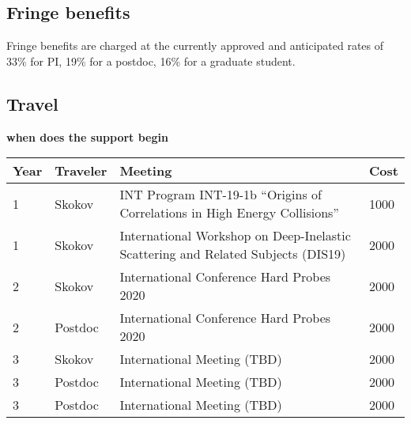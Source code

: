 \documentclass{DOEproposal}
\newcommand{\TODO}{\color{red} \bf}
\begin{document}
		\subsection*{Fringe benefits} 
		\vspace{0.5em}			
	
		\noindent 	
		Fringe benefits are charged at the currently approved and anticipated rates of 33\%
		for PI, 19\% for a postdoc, 
		16\% for a graduate student.%
		\vspace{1.2em}			

		\subsection*{Travel} 

		\vspace{0.5em}			
		
		{\TODO {when does the support begin} } \\ 
		\begin{center}
{%
\begin{tabular}{|l|l|p{90mm}|l| }
\hline
Year &  Traveler \hspace{0.5cm}  &  Meeting  & Cost   \\
\hline
1 &  Skokov  &  INT Program INT-19-1b
``Origins of Correlations in High Energy Collisions'' & 1000   \\
\hline
1  & Skokov  & International Workshop on Deep-Inelastic Scattering and Related Subjects (DIS19)   & 2000   \\ \hline
2  & Skokov  & International Conference Hard Probes 2020  &  2000   \\ \hline
2  & Postdoc  & 
 International Conference Hard Probes 2020 
 &  2000  \\ \hline
3  & Skokov  & International Meeting (TBD) &  2000  \\ \hline
3 & Postdoc &  International Meeting (TBD) &  2000\\ \hline
3 & Postdoc  & International Meeting (TBD) &  2000 \\ \hline
\end{tabular}
}
\end{center}
			
				
\end{document}
